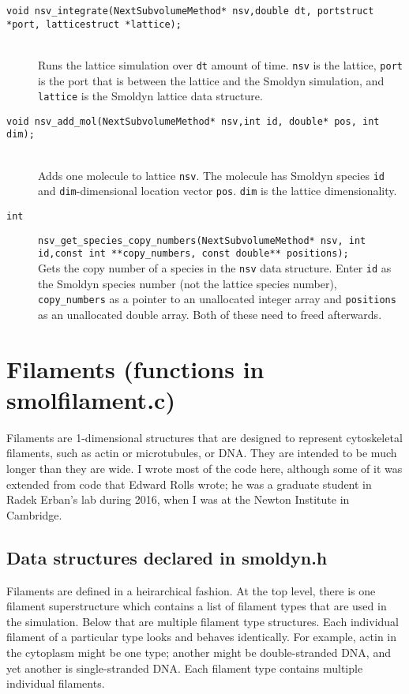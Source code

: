 \documentclass {scrbook}
\newcommand {\ttt} {\texttt}
\begin{document}
\begin{description}
\item[\ttt{void nsv\_integrate(NextSubvolumeMethod* nsv,double dt, portstruct *port, latticestruct *lattice);}]
\hfill \\
Runs the lattice simulation over \ttt{dt} amount of time. \ttt{nsv} is the lattice, \ttt{port} is the port that is between the lattice and the Smoldyn simulation, and \ttt{lattice} is the Smoldyn lattice data structure.

\item[\ttt{void nsv\_add\_mol(NextSubvolumeMethod* nsv,int id, double* pos, int dim);}]
\hfill \\
Adds one molecule to lattice \ttt{nsv}. The molecule has Smoldyn species \ttt{id} and \ttt{dim}-dimensional location vector \ttt{pos}. \ttt{dim} is the lattice dimensionality.

\item[\ttt{int}]
\ttt{nsv\_get\_species\_copy\_numbers(NextSubvolumeMethod* nsv, int id,const int **copy\_numbers, const double** positions);}
\hfill \\
Gets the copy number of a species in the \ttt{nsv} data structure. Enter \ttt{id} as the Smoldyn species number (not the lattice species number), \ttt{copy\_numbers} as a pointer to an unallocated integer array and \ttt{positions} as an unallocated double array. Both of these need to freed afterwards.



\end{description}

\section{Filaments (functions in smolfilament.c)}

Filaments are 1-dimensional structures that are designed to represent cytoskeletal filaments, such as actin or microtubules, or DNA. They are intended to be much longer than they are wide. I wrote most of the code here, although some of it was extended from code that Edward Rolls wrote; he was a graduate student in Radek Erban's lab during 2016, when I was at the Newton Institute in Cambridge.

\subsection*{Data structures declared in smoldyn.h}

Filaments are defined in a heirarchical fashion. At the top level, there is one filament superstructure which contains a list of filament types that are used in the simulation. Below that are multiple filament type structures. Each individual filament of a particular type looks and behaves identically. For example, actin in the cytoplasm might be one type; another might be double-stranded DNA, and yet another is single-stranded DNA. Each filament type contains multiple individual filaments.
\end{document}
